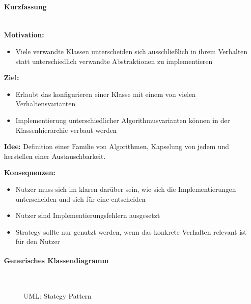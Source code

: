 \documentclass[ngerman]{tuda_summary}
\begin{document}
\paragraph{Kurzfassung}\mbox{}\\
\textbf{Motivation:}
\begin{itemize}
    \item Viele verwandte Klassen unterscheiden sich ausschließlich in ihrem Verhalten statt unterschiedlich verwandte Abstraktionen zu implementieren
\end{itemize}

\textbf{Ziel:}
\begin{itemize}
    \item Erlaubt das konfigurieren einer Klasse mit einem von vielen Verhaltensvarianten
    \item Implementierung unterschiedlicher Algorithmusvarianten können in der Klassenhierarchie verbaut werden
\end{itemize}

\textbf{Idee:} Definition einer Familie von Algorithmen, Kapselung von jedem und herstellen einer Austauschbarkeit.

\textbf{Konsequenzen:}
\begin{itemize}
    \item Nutzer muss sich im klaren darüber sein, wie sich die Implementierungen unterscheiden und sich für eine entscheiden
    \item Nutzer sind Implementierungsfehlern ausgesetzt
    \item Strategy sollte nur genutzt werden, wenn das konkrete Verhalten relevant ist für den Nutzer
\end{itemize}

\paragraph{Generisches Klassendiagramm}\mbox{}\\
\begin{figure}[ht]
    \centering
    \caption{UML: Stategy Pattern}
\end{figure}
\end{document}
